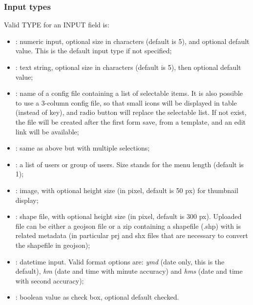 \subsubsection{Input types}

Valid TYPE for an INPUT field is:
\begin{itemize}
	\item {}: numeric input, optional size in characters (default is 5), and optional default value. This is the default input type if not specified;
	\item {} : text string, optional size in characters (default is 5), then optional default value;
	\item {}: name of a config file containing a  list of selectable items. It is also possible to use a  3-column config file, so that small icons will be displayed in table (instead of key), and radio button will replace the selectable list. If not exist, the file will be created after the first form save, from a template, and an edit link will be available;
	\item {}: same as above but with multiple selections;
	\item {}: a list of users or group of users. Size stands for the menu length (default is 1);
	\item {}: image, with optional height size (in pixel, default is 50 px) for thumbnail display;
	\item {}: shape file, with optional height size (in pixel, default is 300 px). Uploaded file can be either a geojson file or a zip containing a shapefile (.shp) with is related metadata (in particular prj and shx files that are necessary to convert the shapefile in geojson);
	\item {}: datetime input. Valid format options are: \textit{ymd} (date only, this is the default), \textit{hm} (date and time with minute accuracy) and \textit{hms} (date and time with second accuracy);
	\item {}: boolean value as check box, optional default checked.
\end{itemize}

